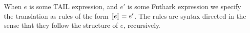 \documentclass[11pt]{article}
\begin{document}
When $e$ is some TAIL expression, and $e'$ is some Futhark expression we specify the translation as rules of the form $\llbracket e \rrbracket = e'$. The rules are syntax-directed in the sense that they follow the structure of $e$, recursively. 

\end{document}
